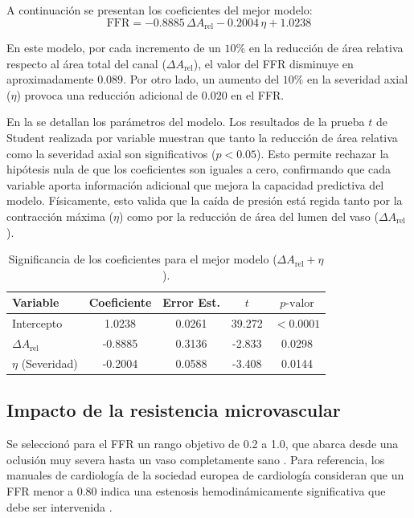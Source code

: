 \documentclass[12pt, letterpaper]{article}
\begin{document}
A continuación se presentan los coeficientes del mejor modelo:
\begin{equation}
  \label{eq:modelo_sem_final}
  \text{FFR} = - 0.8885\,\Delta A_{\text{rel}} - 0.2004\,\eta + 1.0238 
\end{equation}

En este modelo, por cada incremento de un $10\%$ en la reducción de área relativa respecto al área total del canal ($\Delta A_{\text{rel}}$), el valor del FFR disminuye en aproximadamente $0.089$. Por otro lado, un aumento del $10\%$ en la severidad axial ($\eta$) provoca una reducción adicional de $0.020$ en el FFR.

En la  se detallan los parámetros del modelo. Los resultados de la prueba $t$ de Student realizada por variable muestran que tanto la reducción de área relativa como la severidad axial son significativos ($p < 0.05$). Esto permite rechazar la hipótesis nula de que los coeficientes son iguales a cero, confirmando que cada variable aporta información adicional que mejora la capacidad predictiva del modelo. Físicamente, esto valida que la caída de presión está regida tanto por la contracción máxima ($\eta$) como por la reducción de área del lumen del vaso ($\Delta A_{\text{rel}}$).

\vspace{0.5cm}
\begin{table}[htbp]
  \centering
  \caption{Significancia de los coeficientes para el mejor modelo ($\Delta A_{\text{rel}} + \eta$).}
  \label{tab:coeficientes_sem}
  \begin{tabular}{lcccc}
    \hline
    \textbf{Variable} & \textbf{Coeficiente} & \textbf{Error Est.} & $t$ & $p\text{-valor}$ \\ \hline
    Intercepto & 1.0238 & 0.0261 & 39.272 & $< 0.0001$ \\
    $\Delta A_{\text{rel}}$ & -0.8885 & 0.3136 & -2.833 & 0.0298 \\
    $\eta$ (Severidad) & -0.2004 & 0.0588 & -3.408 & 0.0144 \\ \hline
  \end{tabular}
\end{table}


\subsection{Impacto de la resistencia microvascular} \label{sec:impacto_resistencia_microvascular}

Se seleccionó para el FFR un rango objetivo de 0.2 a 1.0, que abarca desde una oclusión muy severa hasta un vaso completamente sano \cite{manual_ffr08}. Para referencia, los manuales de cardiología de la sociedad europea de cardiología consideran que un FFR menor a 0.80 indica una estenosis hemodinámicamente significativa que debe ser intervenida \cite{manual_ffr08}. 
\end{document}
